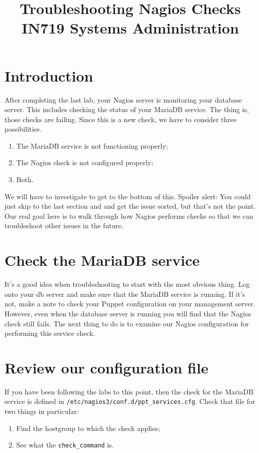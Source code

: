 \documentclass{article}         %
\title{Troubleshooting Nagios Checks\\ IN719 Systems Administration}
\date{}                                                 %
\begin{document}
\maketitle

\section*{Introduction}
After completing the last lab, your Nagios server is monitoring your database server. This includes checking the status
of your MariaDB service. The thing is, those checks are failing. Since this is a new check, we have to consider three possibilities.

\begin{enumerate}
  \item The MariaDB service is not functioning properly;
  \item The Nagios check is not configured properly;
  \item Both.
\end{enumerate}

We will have to investigate to get to the bottom of this. Spoiler alert: You could just skip to the last section and and get the issue sorted, but that's not the point. Our real goal here is to walk through how Nagios performs checks so that we can troubleshoot other issues in the future.

\section{Check the MariaDB service}
It's a good idea when troubleshooting to start with the most obvious thing. Log onto your db server and make sure that the MariaDB service is running. If it's not, make a note to check your Puppet configuration on your management server. However, even when the database server is running you will find that the Nagios check still fails. The next thing to do is to examine our Nagios configuration for performing this service check.

\section{Review our configuration file}
If you have been following the labs to this point, then the check for the MariaDB service is defined in \texttt{/etc/nagios3/conf.d/ppt\_services.cfg}. Check that file for two things in particular:

\begin{enumerate}
  \item Find the hostgroup to which the check applies;
  \item See what the \texttt{check\_command} is.
\end{enumerate}
\end{document}
